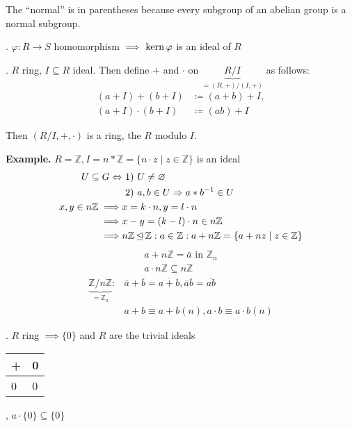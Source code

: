 The ``normal'' is in parentheses because every subgroup of an abelian group is a normal subgroup.

\Remark.
$\varphi: R \rightarrow S$ homomorphism $\implies$ $\operatorname{kern} \varphi$ is an ideal of $R$

\Theorem.
$R$ ring, $ I \subseteq R$ ideal. Then define $+$ and $\cdot$ on $\underbrace{R / I}_{=(R,+)/(I,+)}$ as follows:
\begin{align*}
  (a+I) + (b+I) &\coloneqq (a+b)+I, \\
  (a+I) \cdot (b+I) &\coloneqq (ab) + I
\end{align*}

Then $(R / I, +, \cdot)$ is a ring, the  $R$ modulo $I$.

\textbf{Example.}
$R = \mathbb{Z}, I = n*\mathbb{Z} = \{n \cdot z \mid z \in \mathbb{Z}\}$ is an ideal
\begin{align*}
  U \subseteq G \Leftrightarrow & ~1)~ U \neq \varnothing\\
                                & ~2)~ a,b \in U \Rightarrow a*b^{-1} \in U\\
  x,y \in n\mathbb{Z} \implies  & x = k\cdot n, y = l\cdot n\\
                      \implies  & x -y = (k-l) \cdot n \in n\mathbb{Z}\\
                      \implies  & n\mathbb{Z} \operatorname{\trianglelefteq} \mathbb{Z}:
                                  a \in \mathbb{Z} : a+n\mathbb{Z} =
                                  \{ a+nz \mid z\in \mathbb{Z} \}
\end{align*}
\begin{align*}
  a+n\mathbb{Z} = \bar{a} \text{ in } \mathbb{Z}_n \\
  a \cdot n \mathbb{Z} \subseteq n \mathbb{Z}
\end{align*}
\begin{align*}
  \underbrace{\mathbb{Z} / n \mathbb{Z}}_{=\mathbb{Z}_n}:
    & \bar{a} + \bar{b} = \overline{a+b}, \bar{a} \bar{b} = \overline{ab} \\
    & a+b \equiv a+b (n), a\cdot b \equiv a\cdot b (n)
\end{align*}

\Remark.
$R$ ring $\implies \{0\}$ and $R$ are the trivial ideals

\begin{tabular}{l|l}
+ & 0 \\
\hline
0 & 0
\end{tabular}
, $a \cdot \{0\} \subseteq \{0\}$

